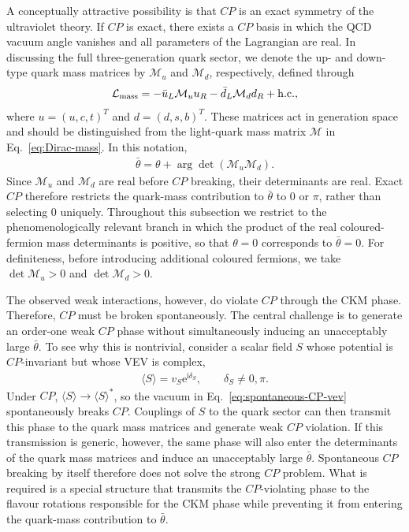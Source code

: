 \documentclass[review]{elsarticle}
\numberwithin{equation}{section}
\numberwithin{table}{section}
\numberwithin{figure}{section}
\def\i{\mathrm{i}}
\def\e{\mathrm{e}}
\def\M{\mathcal{M}}
\def\hc{{\rm h.c.}}
\begin{document}
A conceptually attractive possibility is that $CP$ is an exact symmetry of the ultraviolet theory. If $CP$ is exact, there exists a $CP$ basis in which the QCD vacuum angle vanishes and all parameters of the Lagrangian are real. In discussing the full three-generation quark sector, we denote the up- and down-type quark mass matrices by $\M_u$ and $\M_d$, respectively, defined through
\begin{align}
    \mathcal{L}_{\rm mass} = -\bar u_L\M_u u_R -\bar d_L\M_d d_R +\hc ,
    \label{eq:quark-mass-matrices-CP-solutions}
\end{align}
where $u=(u,c,t)^T$ and $d=(d,s,b)^T$. These matrices act in generation space and should be distinguished from the light-quark mass matrix $\M$ in Eq.~\eqref{eq:Dirac-mass}. In this notation,
\begin{align}
    \bar\theta = \theta+\arg\det(\M_u\M_d).
    \label{eq:bartheta-full-quark-sector}
\end{align}
Since $\M_u$ and $\M_d$ are real before $CP$ breaking, their determinants are real. Exact $CP$ therefore restricts the quark-mass contribution to $\bar\theta$ to $0$ or $\pi$, rather than selecting $0$ uniquely. Throughout this subsection we restrict to the phenomenologically relevant branch in which the product of the real coloured-fermion mass determinants is positive, so that $\theta=0$ corresponds to $\bar\theta=0$. For definiteness, before introducing additional coloured fermions, we take $\det\M_u>0$ and $\det\M_d>0$.



The observed weak interactions, however, do violate $CP$ through the CKM phase. Therefore, $CP$ must be broken spontaneously. The central challenge is to generate an order-one weak $CP$ phase without simultaneously inducing an unacceptably large $\bar\theta$. To see why this is nontrivial, consider a scalar field $S$ whose potential is $CP$-invariant but whose VEV is complex,
\begin{align}
    \langle S\rangle
    =
    v_S\e^{\i\delta_S},
    \qquad
    \delta_S\neq0,\pi.
    \label{eq:spontaneous-CP-vev}
\end{align}
Under $CP$, $\langle S\rangle\to\langle S\rangle^*$, so the vacuum in Eq.~\eqref{eq:spontaneous-CP-vev} spontaneously breaks $CP$. Couplings of $S$ to the quark sector can then transmit this phase to the quark mass matrices and generate weak $CP$ violation. If this transmission is generic, however, the same phase will also enter the determinants of the quark mass matrices and induce an unacceptably large $\bar\theta$. Spontaneous $CP$ breaking by itself therefore does not solve the strong $CP$ problem. What is required is a special structure that transmits the $CP$-violating phase to the flavour rotations responsible for the CKM phase while preventing it from entering the quark-mass contribution to $\bar\theta$.
\end{document}
